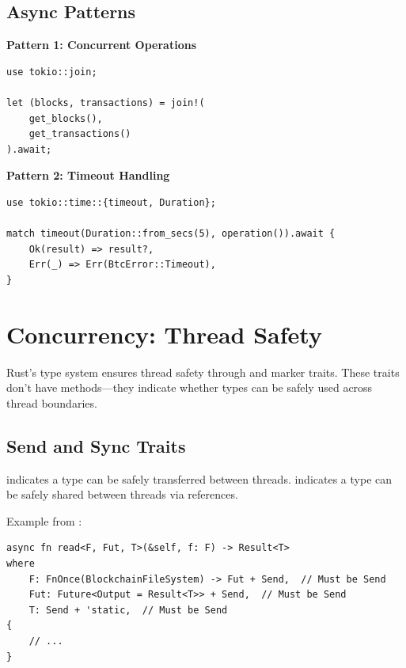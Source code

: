 \subsection{Async Patterns}
\label{subsec:ch24-async-patterns}

\textbf{Pattern 1: Concurrent Operations}
\begin{verbatim}
use tokio::join;

let (blocks, transactions) = join!(
    get_blocks(),
    get_transactions()
).await;
\end{verbatim}

\textbf{Pattern 2: Timeout Handling}
\begin{verbatim}
use tokio::time::{timeout, Duration};

match timeout(Duration::from_secs(5), operation()).await {
    Ok(result) => result?,
    Err(_) => Err(BtcError::Timeout),
}
\end{verbatim}

\section{Concurrency: Thread Safety}
\label{sec:ch24-concurrency}

Rust's type system ensures thread safety through  and  marker traits. These traits don't have methods---they indicate whether types can be safely used across thread boundaries.

\subsection{Send and Sync Traits}
\label{subsec:ch24-send-sync}

 indicates a type can be safely transferred between threads.  indicates a type can be safely shared between threads via references.

Example from :

\begin{listing}[htbp]
\caption{Send and Sync trait bounds}
\label{lst:ch24-send-sync}
\begin{verbatim}
async fn read<F, Fut, T>(&self, f: F) -> Result<T>
where
    F: FnOnce(BlockchainFileSystem) -> Fut + Send,  // Must be Send
    Fut: Future<Output = Result<T>> + Send,  // Must be Send
    T: Send + 'static,  // Must be Send
{
    // ...
}
\end{verbatim}
\end{listing}

